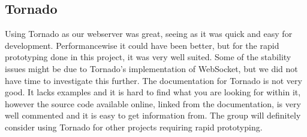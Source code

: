 \subsection{Tornado}
Using Tornado as our webserver was great, seeing as it was quick and easy for development. Performancewise it could have been
better, but for the rapid prototyping done in this project, it was very well suited. Some of the stability issues might be due
to Tornado's implementation of WebSocket, but we did not have time to investigate this further. The documentation for Tornado
is not very good. It lacks examples and it is hard to find what you are looking for within it, however the source code available
online, linked from the documentation, is very well commented and it is easy to get information from.
The group will definitely consider using Tornado for other projects requiring rapid prototyping.